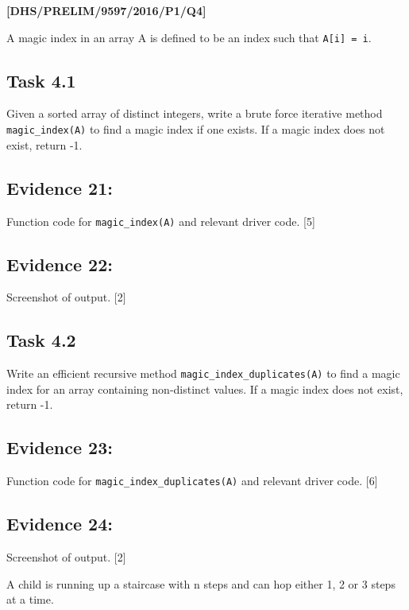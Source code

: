 \item \textbf{{[}DHS/PRELIM/9597/2016/P1/Q4{]} }

A magic index in an array A is defined to be an index such that \texttt{A{[}i{]}
= i}. 

\subsection*{Task 4.1 }

Given a sorted array of distinct integers, write a brute force iterative
method \texttt{magic\_index(A)} to find a magic index if one exists.
If a magic index does not exist, return -1. 

\subsection*{Evidence 21: }

Function code for \texttt{magic\_index(A)} and relevant driver code.\hfill{}
{[}5{]}

\subsection*{Evidence 22: }

Screenshot of output.\hfill{} {[}2{]}

\subsection*{Task 4.2 }

Write an efficient recursive method \texttt{magic\_index\_duplicates(A)}
to find a magic index for an array containing non-distinct values.
If a magic index does not exist, return -1.

\subsection*{Evidence 23: }

Function code for \texttt{magic\_index\_duplicates(A)} and relevant
driver code. \hfill{} {[}6{]}

\subsection*{Evidence 24:}

Screenshot of output. \hfill{} {[}2{]}

A child is running up a staircase with n steps and can hop either
1, 2 or 3 steps at a time. 


